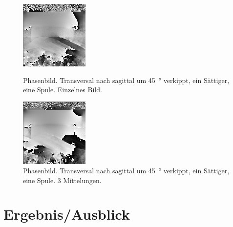 \documentclass[
    11pt,
    ngerman
]{scrreprt}
\begin{document}
\begin{figure}[htbp]
    \begin{minipage}[htbp]{.45\textwidth}
        \centering
        \includegraphics[width=.9\textwidth]{Abbildungen/2015-03-13_27_1.png}
        \caption{Phasenbild. Transversal nach sagittal um \SI{45}{\degree} verkippt, ein Sättiger, eine Spule. Einzelnes Bild.}
        \label{fig:2015-03-13_27_1}
    \end{minipage}
    \hfill
    \begin{minipage}[htbp]{.45\textwidth}
        \centering
        \includegraphics[width=.9\textwidth]{Abbildungen/2015-03-13_29_1.png}
    \caption{Phasenbild. Transversal nach sagittal um \SI{45}{\degree} verkippt, ein Sättiger, eine Spule. 3 Mittelungen.}
        \label{fig:2015-03-13_29_1}
    \end{minipage}
\end{figure}

    \chapter{Ergebnis/Ausblick}

    
\end{document}
